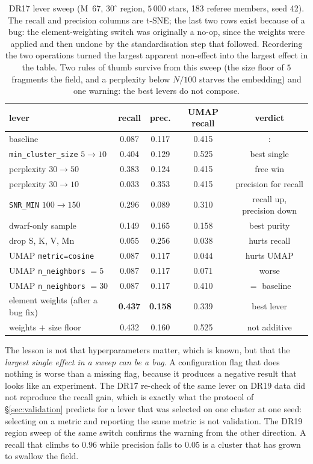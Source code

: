 \begin{table}[htbp]
\centering
\small
{}
\begin{tabular}{@{}lcccc@{}} \toprule lever & recall & prec. & UMAP recall &
verdict \\ \midrule baseline & 0.087 & 0.117 & 0.415 &: \\
\texttt{min\_cluster\_size} $5\!\to\!10$ & 0.404 & 0.129 & 0.525 & best single
\\ perplexity $30\!\to\!50$ & 0.383 & 0.124 & 0.415 & free win \\ perplexity
$30\!\to\!10$ & 0.033 & 0.353 & 0.415 & precision for recall \\
\texttt{SNR\_MIN} $100\!\to\!150$ & 0.296 & 0.089 & 0.310 & recall up,
precision down \\ dwarf-only sample & 0.149 & 0.165 & 0.158 & best purity \\
drop S, K, V, Mn & 0.055 & 0.256 & 0.038 & hurts recall \\ UMAP
\texttt{metric=cosine} & 0.087 & 0.117 & 0.044 & hurts UMAP \\ UMAP
\texttt{n\_neighbors} $=5$ & 0.087 & 0.117 & 0.071 & worse \\ UMAP
\texttt{n\_neighbors} $=30$ & 0.087 & 0.117 & 0.410 & $=$ baseline \\ element
weights (after a bug fix) & \textbf{0.437} & \textbf{0.158} & 0.339 & best
lever \\ weights $+$ size floor & 0.432 & 0.160 & 0.525 & not additive \\
\bottomrule
\end{tabular}
\caption{DR17 lever sweep (M~67, $30^\circ$ region, $5\,000$ stars, 183 referee
members, seed 42). The recall and precision columns are t-SNE; the last two
rows exist because of a bug: the element-weighting switch was originally a
no-op, since the weights were applied and then undone by the standardisation
step that followed. Reordering the two operations turned the largest apparent
non-effect into the largest effect in the table. Two rules of thumb survive
from this sweep (the size floor of $5$ fragments the field, and a perplexity
below $N/100$ starves the embedding) and one warning: the best levers do not
compose.}
\label{tab:levers}
\end{table}

The lesson is not that hyperparameters matter, which is known, but that the
\emph{largest single effect in a sweep can be a bug}. A configuration flag that
does nothing is worse than a missing flag, because it produces a negative
result that looks like an experiment. The DR17 re-check of the same lever on
DR19 data did not reproduce the recall gain, which is exactly what the protocol
of \S\ref{sec:validation} predicts for a lever that was selected on one cluster
at one seed: selecting on a metric and reporting the same metric is not
validation. The DR19 region sweep of the same switch confirms the warning from
the other direction. A recall that climbs to $0.96$ while precision falls to
$0.05$ is a cluster that has grown to swallow the field.

